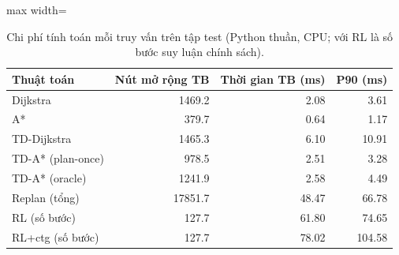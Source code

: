 \begin{table}[!htbp]
\centering
\small
\caption{Chi phí tính toán mỗi truy vấn trên tập test (Python thuần, CPU; với RL là số bước suy luận chính sách).}
\label{tab:tab_expansions}
\begin{adjustbox}{max width=\linewidth}
\begin{tabular}{lrrr}
\toprule
Thuật toán & Nút mở rộng TB & Thời gian TB (ms) & P90 (ms) \\
\midrule
Dijkstra & 1469.2 & 2.08 & 3.61 \\
A* & 379.7 & 0.64 & 1.17 \\
TD-Dijkstra & 1465.3 & 6.10 & 10.91 \\
TD-A* (plan-once) & 978.5 & 2.51 & 3.28 \\
TD-A* (oracle) & 1241.9 & 2.58 & 4.49 \\
Replan (tổng) & 17851.7 & 48.47 & 66.78 \\
RL (số bước) & 127.7 & 61.80 & 74.65 \\
RL+ctg (số bước) & 127.7 & 78.02 & 104.58 \\
\bottomrule
\end{tabular}
\end{adjustbox}
\end{table}
